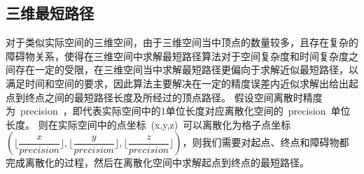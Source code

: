 \subsection{三维最短路径}
\par 对于类似实际空间的三维空间，由于三维空间当中顶点的数量较多，且存在复杂的障碍物关系，使得在三维空间中求解最短路径算法对于空间复杂度和时间复杂度之间存在一定的受限，在三维空间当中求解最短路径更偏向于求解近似最短路径，以满足时间和空间的要求，因此算法主要解决在一定的精度误差内近似求解出给出起点到终点之间的最短路径长度及所经过的顶点路径。
假设空间离散时精度为~precision~，即代表实际空间中的1单位长度对应离散化空间的~precision~单位长度。
则在实际空间中的点坐标~(x,y,z)~可以离散化为格子点坐标$(\lfloor\dfrac{x}{precision}\rfloor,\lfloor\dfrac{y}{precision}\rfloor,\lfloor\dfrac{z}{precision}\rfloor)$，则我们需要对起点、终点和障碍物都完成离散化的过程，然后在离散化空间中求解起点到终点的最短路径。

\FloatBarrier
